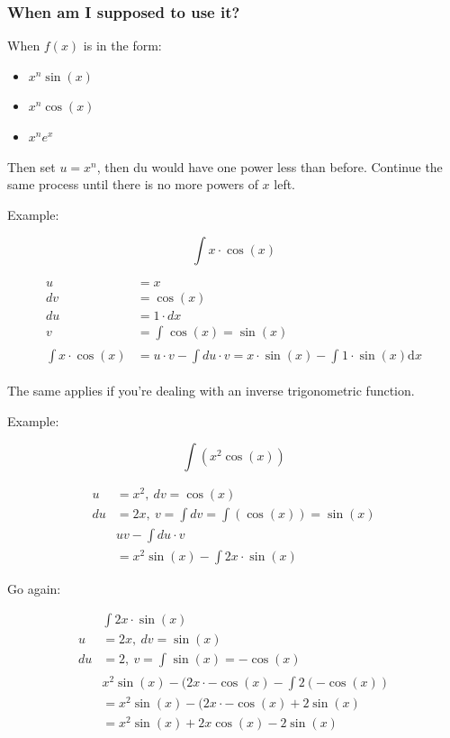 \documentclass[12pt]{article}
\theoremstyle{plain}
\theoremstyle{remark}
\theoremstyle{definition}
\begin{document}
\subsubsection{When am I supposed to use
it?}

When \(f(x)\) is in the form:

\begin{itemize}
\item
  \(x^{n}\sin(x)\)
\item
  \(x^{n}\cos(x)\)
\item
  \(x^{n}e^{x}\)
\end{itemize}

Then set \(u = x^{n}\), then du would have one power less than before.
Continue the same process until there is no more powers of \(x\) left.

Example:

\[\int x \cdot \cos(x)\]

\begin{align*}
u &= x \\
dv &= \cos(x) \\
du &= 1 \cdot dx \\
v &= \int_{}^{}{\cos(x)} = \sin(x) \\
\int x \cdot \cos(x) &= u \cdot v - \int du \cdot v = x \cdot \sin(x) - \int_{}^{}1 \cdot \sin(x)\text{d}x
\end{align*}


The same applies if you're dealing with an inverse trigonometric
function.

Example:

\[\int\left( x^{2}\cos(x) \right)\]

\begin{align*}
u &= x^{2},\ dv = \cos(x) \\
du &= 2x,\ v = \int dv = \int\left( \cos(x) \right) = \sin(x) \\
&uv - \int du \cdot v \\
&= x^{2}\sin(x) - \int 2x \cdot \sin(x)
\end{align*}


Go again:

\begin{align*}
&\int 2x \cdot \sin(x) \\
u &= 2x,\ dv = \sin(x) \\
du &= 2,\ v = \int_{}^{}{\sin(x)} = - \cos(x)
 \\
&x^{2}\sin(x) - (2x \cdot - \cos(x) - \int 2\left( - \cos(x) \right) \\
&= x^{2}\sin(x) - (2x \cdot - \cos(x) + 2\sin(x) \\
&= x^{2}\sin(x) + 2x\cos(x) - 2\sin(x)\
\end{align*}
\end{document}
